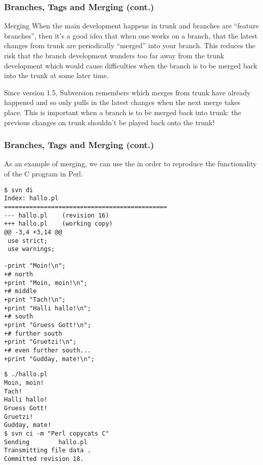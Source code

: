 \begin{frame}[fragile]
    \frametitle{Branches, Tags and Merging (cont.)}

    \begin{alertblock}{Merging}
        When the main development happens in trunk and branches are
        \enquote{feature branches}, then it's a good idea that when one
        works on a branch, that the latest changes from trunk are
        periodically \enquote{merged} into your branch.  This reduces the
        risk that the branch development wanders too far away from the trunk
        development which would cause difficulties when the branch is to be
        merged back into the trunk at some later time.

        Since version 1.5, Subversion remembers which merges from trunk have
        already happened and so only pulls in the latest changes when the
        next merge takes place.  This is important when a branch is to be
        merged back into trunk: the previous changes on trunk shouldn't be
        played back onto the trunk!

    \end{alertblock}
\end{frame}

\begin{frame}[fragile]
    \frametitle{Branches, Tags and Merging (cont.)}
    \linuxframe

    As an example of merging, we can use the  in
    order to reproduce the functionality of the C program in Perl.
\begin{multicols}{2}
\begin{lstlisting}[basicstyle=\tiny\ttfamily\color{black}]
$ svn di
Index: hallo.pl
=============================================
--- hallo.pl    (revision 16)
+++ hallo.pl    (working copy)
@@ -3,4 +3,14 @@
 use strict;
 use warnings;
 
-print "Moin!\n";
+# north
+print "Moin, moin!\n";
+# middle
+print "Tach!\n";
+print "Halli hallo!\n";
+# south
+print "Gruess Gott!\n";
+# further south
+print "Gruetzi!\n";
+# even further south...
+print "Gudday, mate!\n";
\end{lstlisting}
\columnbreak
\begin{lstlisting}[basicstyle=\tiny\ttfamily\color{black}]
$ ./hallo.pl
Moin, moin!
Tach!
Halli hallo!
Gruess Gott!
Gruetzi!
Gudday, mate!
$ svn ci -m "Perl copycats C"
Sending        hallo.pl
Transmitting file data .
Committed revision 18.
\end{lstlisting}
\end{multicols}
\end{frame}

